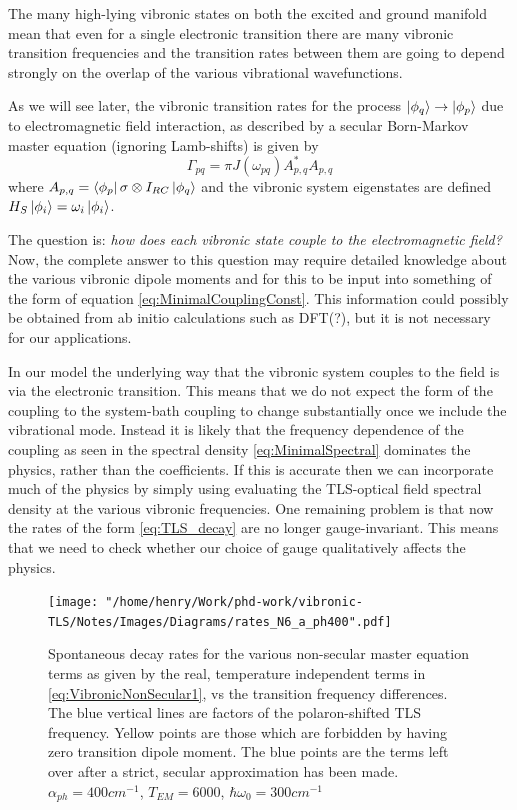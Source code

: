 \documentclass[]{article}
\begin{document}
\begin{itemize}
\begin{itemize}
The many high-lying vibronic states on both the excited and ground manifold mean that even for a single electronic transition there are many vibronic transition frequencies and the transition rates between them are going to depend strongly on the overlap of the various vibrational wavefunctions. 

As we will see later, the vibronic transition rates for the process $\ket{\phi_q}\to\ket{\phi_p}$ due to electromagnetic field interaction, as described by a secular Born-Markov master equation (ignoring Lamb-shifts) is given by
\begin{equation}
\Gamma_{pq} = \pi J(\omega_{pq}) A_{p,q}^{*}A_{p,q}
\end{equation}
where $A_{p,q}=\bra{\phi_p}\sigma\otimes I_{RC}\ket{\phi_q}$ and the vibronic system eigenstates are defined $H_S\ket{\phi_i}= \omega_i\ket{\phi_i}$.

The question is: \textit{how does each vibronic state couple to the electromagnetic field?} Now, the complete answer to this question may require detailed knowledge about the various vibronic dipole moments and for this to be input into something of the form of equation \ref{eq:MinimalCouplingConst}. This information could possibly be obtained from ab initio calculations such as DFT(?), but it is not necessary for our applications.

In our model the underlying way that the vibronic system couples to the field is via the electronic transition. This means that we do not expect the form of the coupling to the system-bath coupling to change substantially once we include the vibrational mode. Instead it is likely that the frequency dependence of the coupling as seen in the spectral density \ref{eq:MinimalSpectral} dominates the physics, rather than the coefficients. If this is accurate then we can incorporate much of the physics by simply using evaluating the TLS-optical field spectral density at the various vibronic frequencies. One remaining problem is that now the rates of the form \ref{eq:TLS_decay} are no longer gauge-invariant. This means that we need to check whether our choice of gauge qualitatively affects the physics.

\begin{figure}[t]
	\centering
	\texttt{[image: "/home/henry/Work/phd-work/vibronic-TLS/Notes/Images/Diagrams/rates\_N6\_a\_ph400".pdf]}
	\caption{Spontaneous decay rates for the various non-secular master equation terms as given by the real, temperature independent terms in \ref{eq:VibronicNonSecular1}, vs the transition frequency differences. The blue vertical lines are factors of the polaron-shifted TLS frequency. Yellow points are those which are forbidden by having zero transition dipole moment. The blue points are the terms left over after a strict, secular approximation has been made. $\alpha_{ph}=400 cm^{-1}$, $T_{EM} =6000$, $\hbar\omega_0 = 300cm^{-1}$}
	\label{fig:DecayRates_FrequencyDiffs}
\end{figure}


\end{itemize}
\end{itemize}
\end{document}
